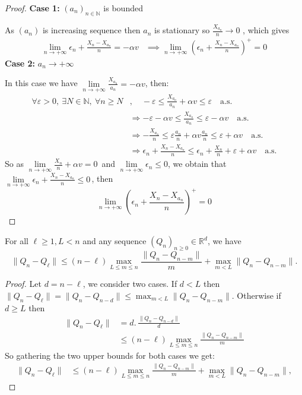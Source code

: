 \begin{proof}	
	\textbf{Case 1:} $(a_n)_{n \in \mathbb{N}}$ is bounded
	
	As \((a_n)\) is increasing sequence then \(a_n\) is stationary so \(\frac{X_{a_n}}{n} \longrightarrow 0\) , which gives
	\begin{align*}
		\lim_{n \to +\infty} \epsilon_n + \frac{X_n - X_{a_n}}{n} = -\alpha v
		&\implies \lim_{n \to +\infty} \left(\epsilon_n + \frac{X_n - X_{a_n}}{n}\right)^+ = 0
	\end{align*}	
	\textbf{Case 2:} $a_n \to +\infty$
	
	In this case we have \(\lim\limits_{n \to +\infty} \frac{X_{a_n}}{a_n} = -\alpha v\), then:
	\begin{align*}
		\forall \varepsilon > 0,\ \exists N \in \mathbb{N},\ \forall n \geq N &,\quad -\varepsilon \leq \frac{X_{a_n}}{a_n} + \alpha v \leq \varepsilon \quad \text{a.s.}\\		
		&\Rightarrow -\varepsilon - \alpha v \leq \frac{X_{a_n}}{a_n} \leq \varepsilon - \alpha v \quad \text{a.s.}\\
		&\Rightarrow -\frac{X_{a_n}}{n} \leq \varepsilon \frac{a_n}{n} + \alpha v \frac{a_n}{n} \leq \varepsilon + \alpha v \quad \text{a.s.}\\
		&\Rightarrow \epsilon_n + \frac{X_n - X_{a_n}}{n} \leq \epsilon_n + \frac{X_n}{n} + \varepsilon + \alpha v \quad \text{a.s.}		
	\end{align*}	
	So as \(\lim\limits_{n \to +\infty} \frac{X_n}{n} + \alpha v = 0\,\) and \(\lim\limits_{n \to +\infty} \epsilon_n \leq 0\), we obtain that \(\lim\limits_{n \to +\infty} \epsilon_n + \frac{X_n - X_{a_n}}{n} \leq 0 \,\), then 
	\[\lim\limits_{n \to +\infty} \left(\epsilon_n +\frac{X_n - X_{a_n}}{n}\right)^+ = 0 \]
\end{proof}

\begin{lemma}\label{lem:mart-2}
	For all \( \ell \geq 1, L < n \) and any sequence \( (Q_n)_{n \geq 0} \in \mathbb{R}^d \), we have
	\[
	\|Q_n - Q_\ell\| \leq (n - \ell) \max_{L \leq m \leq n} \frac{\|Q_n - Q_{n - m}\|}{m} + \max_{m < L} \|Q_n - Q_{n - m}\|.
	\]
\end{lemma}

\begin{proof}
	Let \( d = n - \ell \), we consider two cases. If \( d < L \) then \(\|Q_n - Q_\ell\| = \|Q_n - Q_{n - d}\| \leq \max_{m < L} \|Q_n - Q_{n - m}\|.\)
	Otherwise if \( d \geq L \) then
	\begin{align*}
		\|Q_n - Q_\ell\| &= d.\,\frac{\|Q_n - Q_{n-d}\|}{d} \\		
		& \leq \left(n - \ell\right) \max_{L \leq m \leq n} \frac{\|Q_n - Q_{n-m}\|}{m}
	\end{align*}
	So gathering the two upper bounds for both cases we get:	
	\begin{align*}
		\|Q_n - Q_\ell\| &\leq (n - \ell) \max_{L \leq m \leq n} \frac{\|Q_n - Q_{n - m}\|}{m} + \max_{m < L} \|Q_n - Q_{n - m}\|,
	\end{align*}	
\end{proof}

